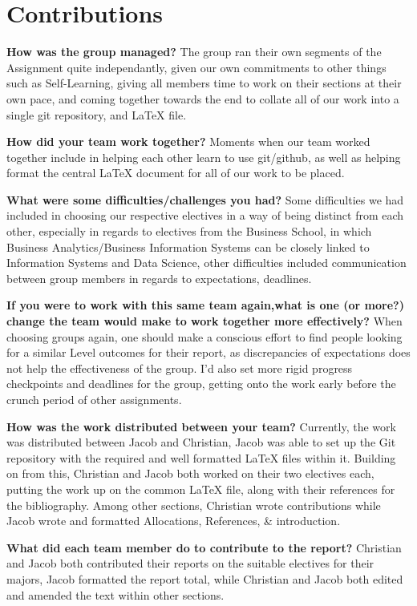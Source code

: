 \section{\textbf{Contributions}} 
\begin{itemize}
\textbf{How was the group managed?}
The group ran their own segments of the Assignment quite independantly, given our own commitments to other things such as Self-Learning, giving all members time to work on their sections at their own pace, and coming together towards the end to collate all of our work into a single git repository, and LaTeX file.
\end{itemize}

\begin{itemize}
\textbf{How did your team work together?}
Moments when our team worked together include in helping each other learn to use git/github, as well as helping format the central LaTeX document for all of our work to be placed.
\end{itemize}

\begin{itemize}
\textbf{What were some difficulties/challenges you had?}
Some difficulties we had included in choosing our respective electives in a way of being distinct from each other, especially in regards to electives from the Business School, in which Business Analytics/Business Information Systems can be closely linked to Information Systems and Data Science, other difficulties included communication between group members in regards to expectations, deadlines.
\end{itemize}

\begin{itemize}
\textbf{If you were to work with this same team again,what is one (or more?) change the team would make to work together more effectively? }
When choosing groups again, one should make a conscious effort to find people looking for a similar Level outcomes for their report, as discrepancies of expectations does not help the effectiveness of the group. I'd also set more rigid progress checkpoints and deadlines for the group, getting onto the work early before the crunch period of other assignments.
\end{itemize}

\begin{itemize}
\textbf{How was the work distributed between your team? }
Currently, the work was distributed between Jacob and Christian, Jacob was able to set up the Git repository with the required and well formatted LaTeX files within it. Building on from this, Christian and Jacob both worked on their two electives each, putting the work up on the common LaTeX file, along with their references for the bibliography. Among other sections, Christian wrote contributions while Jacob wrote and formatted Allocations, References, & introduction.
\end{itemize}

\begin{itemize}
\textbf{What did each team member do to contribute to the report?}
Christian and Jacob both contributed their reports on the suitable electives for their majors, Jacob formatted the report total, while Christian and Jacob both edited and amended the text within other sections.
\end{itemize}
